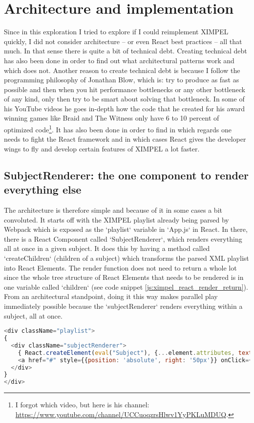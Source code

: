 \section{Architecture and implementation}
Since in this exploration I tried to explore if I could reimplement XIMPEL quickly, I did not consider architecture -- or even React best practices -- all that much. In that sense there is quite a bit of technical debt. Creating technical debt has also been done in order to find out what architectural patterns work and which does not. Another reason to create technical debt is because I follow the programming philosophy of Jonathan Blow, which is: try to produce as fast as possible and then when you hit performance bottlenecks or any other bottleneck of any kind, only then try to be smart about solving that bottleneck. In some of his YouTube videos he goes in-depth how the code that he created for his award winning games like Braid and The Witness only have 6 to 10 percent of optimized code\footnote{I forgot which video, but here is his channel: \url{https://www.youtube.com/channel/UCCuoqzrsHlwv1YyPKLuMDUQ}.}. It has also been done in order to find in which regards one needs to fight the React framework and in which cases React gives the developer wings to fly and develop certain features of XIMPEL a lot faster.

\subsection{SubjectRenderer: the one component to render everything else}
The architecture is therefore simple and because of it in some cases a bit convoluted. It starts off with the XIMPEL playlist already being parsed by Webpack which is exposed as the `playlist` variable in `App.js` in React. In there, there is a React Component called `SubjectRenderer`, which renders everything all at once in a given subject. It does this by having a method called `createChildren` (children of a subject) which transforms the parsed XML playlist into React Elements. The render function does not need to return a whole lot since the whole tree structure of React Elements that needs to be rendered is in one variable called `children` (see code snippet \ref{js:ximpel_react_render_return}). From an architectural standpoint, doing it this way makes parallel play immediately possible because the `subjectRenderer` renders everything within a subject, all at once.

\begin{lstlisting}[language=JavaScript, caption=This is what is returned from the render function in the `subjectRenderer` React Component, label=js:ximpel_react_render_return]
<div className="playlist">
{
  <div className="subjectRenderer">
    { React.createElement(eval("Subject"), {...element.attributes, text: element.text}, children) }
    <a href="#" style={{position: 'absolute', right: '50px'}} onClick={(e) => this.handleMediaItemClick(e)}>>></a>
  </div>
}
</div>
\end{lstlisting}

